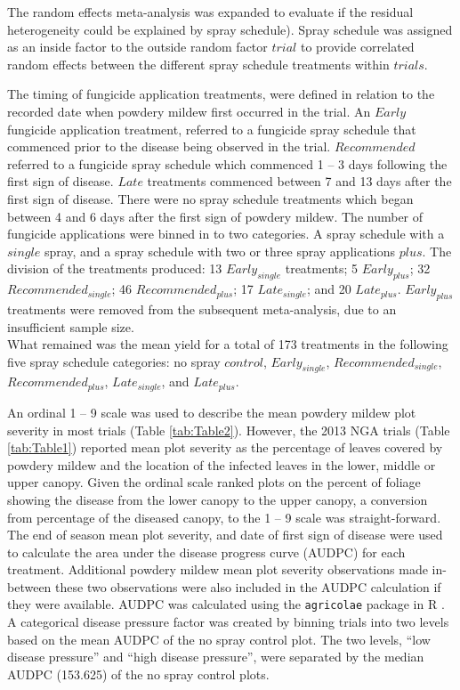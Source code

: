\documentclass[agronomy,article,submit,moreauthors,pdftex]{mdpi}
\begin{document}
The random effects meta-analysis was expanded to evaluate if the residual heterogeneity could be explained by spray schedule).
Spray schedule was assigned as an inside factor to the outside random factor \(trial\) to provide correlated random effects between the different spray schedule treatments within \(trials\).

The timing of fungicide application treatments, were defined in relation to the recorded date when powdery mildew first occurred in the trial.
An \(Early\) fungicide application treatment, referred to a fungicide spray schedule that commenced prior to the disease being observed in the trial.
\(Recommended\) referred to a fungicide spray schedule which commenced 1 -- 3 days following the first sign of disease.
\(Late\) treatments commenced between 7 and 13 days after the first sign of disease.
There were no spray schedule treatments which began between 4 and 6 days after the first sign of powdery mildew.
The number of fungicide applications were binned in to two categories.
A spray schedule with a \(single\) spray, and a spray schedule with two or three spray applications \(plus\).
The division of the treatments produced: 13 \(Early_{single}\) treatments; 5 \(Early_{plus}\); 32 \(Recommended_{single}\); 46 \(Recommended_{plus}\); 17 \(Late_{single}\); and 20 \(Late_{plus}\).
\(Early_{plus}\) treatments were removed from the subsequent meta-analysis, due to an insufficient sample size.\\
What remained was the mean yield for a total of 173 treatments in the following five spray schedule categories: no spray \(control\), \(Early_{single}\), \(Recommended_{single}\), \(Recommended_{plus}\), \(Late_{single}\), and \(Late_{plus}\).

An ordinal 1 -- 9 scale was used to describe the mean powdery mildew plot severity in most trials (Table \ref{tab:Table2}).
However, the 2013 NGA trials (Table \ref{tab:Table1}) reported mean plot severity as the percentage of leaves covered by powdery mildew and the location of the infected leaves in the lower, middle or upper canopy.
Given the ordinal scale ranked plots on the percent of foliage showing the disease from the lower canopy to the upper canopy, a conversion from percentage of the diseased canopy, to the 1 -- 9 scale was straight-forward.
The end of season mean plot severity, and date of first sign of disease were used to calculate the area under the disease progress curve (AUDPC) for each treatment.
Additional powdery mildew mean plot severity observations made in-between these two observations were also included in the AUDPC calculation if they were available.
AUDPC was calculated using the \texttt{agricolae} package in R \citep{agricolae2020}.
A categorical disease pressure factor was created by binning trials into two levels based on the mean AUDPC of the no spray control plot.
The two levels, ``low disease pressure'' and ``high disease pressure'', were separated by the median AUDPC (153.625) of the no spray control plots.
\end{document}
